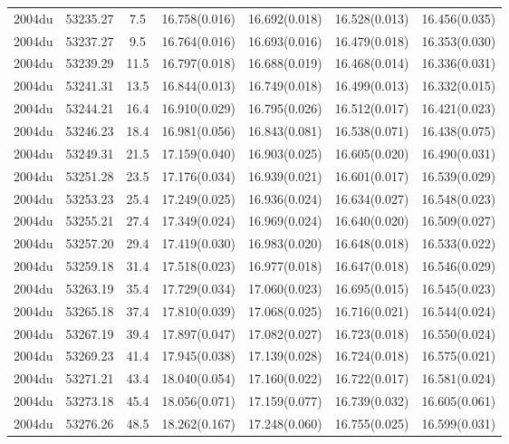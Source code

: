 \begin{table*}
\begin{tabular}{ccccccc}
2004du	  & 53235.27	 & 7.5	& 16.758(0.016)	 & 16.692(0.018)	 & 16.528(0.013)	 & 16.456(0.035) \\ 
2004du	  & 53237.27	 & 9.5	& 16.764(0.016)	 & 16.693(0.016)	 & 16.479(0.018)	 & 16.353(0.030) \\ 
2004du	  & 53239.29	 & 11.5	& 16.797(0.018)	 & 16.688(0.019)	 & 16.468(0.014)	 & 16.336(0.031) \\ 
2004du	  & 53241.31	 & 13.5	& 16.844(0.013)	 & 16.749(0.018)	 & 16.499(0.013)	 & 16.332(0.015) \\ 
2004du	  & 53244.21	 & 16.4	& 16.910(0.029)	 & 16.795(0.026)	 & 16.512(0.017)	 & 16.421(0.023) \\ 
2004du	  & 53246.23	 & 18.4	& 16.981(0.056)	 & 16.843(0.081)	 & 16.538(0.071)	 & 16.438(0.075) \\ 
2004du	  & 53249.31	 & 21.5	& 17.159(0.040)	 & 16.903(0.025)	 & 16.605(0.020)	 & 16.490(0.031) \\ 
2004du	  & 53251.28	 & 23.5	& 17.176(0.034)	 & 16.939(0.021)	 & 16.601(0.017)	 & 16.539(0.029) \\ 
2004du	  & 53253.23	 & 25.4	& 17.249(0.025)	 & 16.936(0.024)	 & 16.634(0.027)	 & 16.548(0.023) \\ 
2004du	  & 53255.21	 & 27.4	& 17.349(0.024)	 & 16.969(0.024)	 & 16.640(0.020)	 & 16.509(0.027) \\ 
2004du	  & 53257.20	 & 29.4	& 17.419(0.030)	 & 16.983(0.020)	 & 16.648(0.018)	 & 16.533(0.022) \\ 
2004du	  & 53259.18	 & 31.4	& 17.518(0.023)	 & 16.977(0.018)	 & 16.647(0.018)	 & 16.546(0.029) \\ 
2004du	  & 53263.19	 & 35.4	& 17.729(0.034)	 & 17.060(0.023)	 & 16.695(0.015)	 & 16.545(0.023) \\ 
2004du	  & 53265.18	 & 37.4	& 17.810(0.039)	 & 17.068(0.025)	 & 16.716(0.021)	 & 16.544(0.024) \\ 
2004du	  & 53267.19	 & 39.4	& 17.897(0.047)	 & 17.082(0.027)	 & 16.723(0.018)	 & 16.550(0.024) \\ 
2004du	  & 53269.23	 & 41.4	& 17.945(0.038)	 & 17.139(0.028)	 & 16.724(0.018)	 & 16.575(0.021) \\ 
2004du	  & 53271.21	 & 43.4	& 18.040(0.054)	 & 17.160(0.022)	 & 16.722(0.017)	 & 16.581(0.024) \\ 
2004du	  & 53273.18	 & 45.4	& 18.056(0.071)	 & 17.159(0.077)	 & 16.739(0.032)	 & 16.605(0.061) \\ 
2004du	  & 53276.26	 & 48.5	& 18.262(0.167)	 & 17.248(0.060)	 & 16.755(0.025)	 & 16.599(0.031) \\ 

\end{tabular}
\end{table*}
